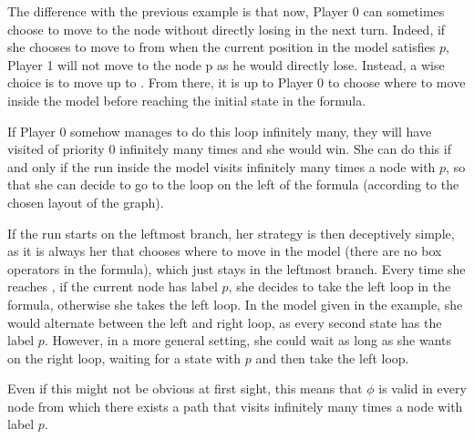 The difference with the previous example is that now, Player 0
can sometimes choose to move to the node \State{\wedge}
without directly losing in the next turn.
Indeed, if she chooses to move to \State{\wedge}
from \State\vee when the current position in the model satisfies $p$,
Player 1 will not move to the node \State p as he would directly lose.
Instead, a wise choice is to move up to \State{\diam{}}.
From there, it is up to Player 0 to choose where to move inside the model
before reaching the initial state \State\nu in the formula.

If Player 0 somehow manages to do this loop infinitely many,
they will have visited \State\nu of priority 0 infinitely many times
and she would win.
She can do this if and only if the run inside the model visits infinitely many
times a node with $p$, so that she can decide to go to the loop on the left of the
formula (according to the chosen layout of the graph).

If the run starts on the leftmost branch, her strategy is then deceptively simple,
as it is always her that chooses where to move in the model (there are no box operators in the formula),
which just stays in the leftmost branch. Every time she reaches \State\vee,
if the current node has label $p$, she decides to take the left loop in
the formula, otherwise she takes the left loop.
In the model given in the example, she would alternate between the left and right loop,
as every second state has the label $p$. However, in a more general setting,
she could wait as long as she wants on the right loop, waiting for a state
with $p$ and then take the left loop.

Even if this might not be obvious at first sight,
this means that $\phi$ is valid in every node
from which there exists
a path that visits infinitely many times a node with label $p$.




